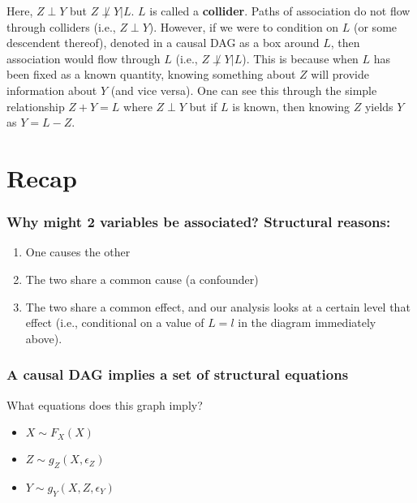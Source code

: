 Here, $Z \perp Y$ but $Z \not\perp Y | L$. $L$ is called a \textbf{collider}. Paths of association do not flow through colliders (i.e., $Z \perp Y$). However, if we were to condition on $L$ (or some descendent thereof), denoted in a causal DAG as a box around $L$, then association would flow through $L$ (i.e., $Z \not\perp Y | L$). This is because when $L$ has been fixed as a known quantity, knowing something about $Z$ will provide information about $Y$ (and vice versa). One can see this through the simple relationship $Z+Y=L$ where $Z \perp Y$ but if $L$ is known, then knowing $Z$ yields $Y$ as $Y=L-Z$.

\section{Recap}
\subsubsection{Why might 2 variables be associated? Structural reasons:}

\begin{enumerate}
\item One causes the other
\item The two share a common cause (a confounder)
\item The two share a common effect, and our analysis looks at a certain level that effect (i.e., conditional on a value of $L=l$ in the diagram immediately above).
\end{enumerate}

\subsubsection{A causal DAG implies a set of structural equations}

\begin{center}
\end{center}

What equations does this graph imply?
\begin{itemize}
\item $X \sim F_X(X)$
\item $Z \sim g_Z(X, \epsilon_Z)$
\item $Y \sim g_Y(X, Z, \epsilon_Y)$
\end{itemize}

